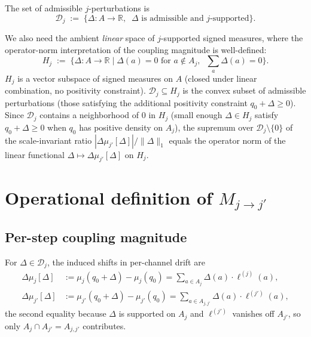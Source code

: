 \documentclass{article}
\begin{document}
The set of admissible $j$-perturbations is
\begin{equation}
  \mathcal{D}_j \;:=\; \{\Delta : A \to \mathbb{R}, \;\;\Delta
  \text{ is admissible and $j$-supported}\}.
\end{equation}

We also need the ambient \emph{linear} space of $j$-supported
signed measures, where the operator-norm interpretation of the
coupling magnitude is well-defined:
\begin{equation}
\label{eq:Hj-def}
  H_j \;:=\; \{\Delta : A \to \mathbb{R} \mid \Delta(a) = 0
  \text{ for } a \notin A_j, \;\; \textstyle\sum_a \Delta(a) = 0\}.
\end{equation}
$H_j$ is a vector subspace of signed measures on $A$ (closed under
linear combination, no positivity constraint).
$\mathcal{D}_j \subseteq H_j$ is the convex subset of admissible
perturbations (those satisfying the additional positivity
constraint $q_0 + \Delta \geq 0$).  Since $\mathcal{D}_j$ contains
a neighborhood of $0$ in $H_j$ (small enough $\Delta \in H_j$
satisfy $q_0 + \Delta \geq 0$ when $q_0$ has positive density on
$A_j$), the supremum over $\mathcal{D}_j \setminus \{0\}$ of the
scale-invariant ratio
$|\Delta\mu_{j'}[\Delta]|/\|\Delta\|_1$ equals the operator norm of
the linear functional $\Delta \mapsto \Delta\mu_{j'}[\Delta]$ on
$H_j$.

\section{Operational definition of \texorpdfstring{$M_{j \to j'}$}{M\_jj'}}

\subsection{Per-step coupling magnitude}

For $\Delta \in \mathcal{D}_j$, the induced shifts in per-channel
drift are
\begin{align}
  \Delta\mu_j[\Delta] &:= \mu_j(q_0 + \Delta) - \mu_j(q_0)
    = \sum_{a \in A_j} \Delta(a) \cdot \ell^{(j)}(a), \\
  \Delta\mu_{j'}[\Delta] &:= \mu_{j'}(q_0 + \Delta) - \mu_{j'}(q_0)
    = \sum_{a \in A_{j, j'}} \Delta(a) \cdot \ell^{(j')}(a),
\end{align}
the second equality because $\Delta$ is supported on $A_j$ and
$\ell^{(j')}$ vanishes off $A_{j'}$, so only $A_j \cap A_{j'} =
A_{j,j'}$ contributes.
\end{document}
